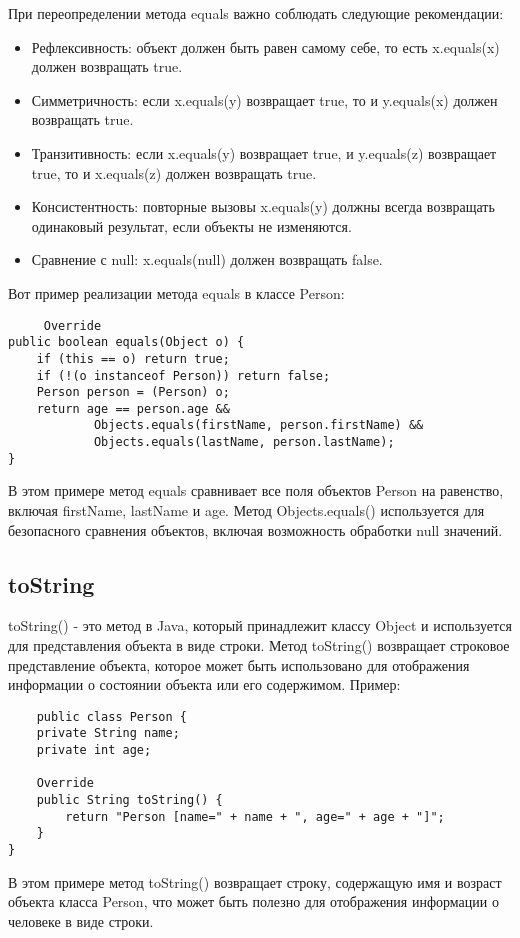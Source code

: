 При переопределении метода equals важно соблюдать следующие рекомендации:
\begin{itemize}
    \item Рефлексивность: объект должен быть равен самому себе, то есть x.equals(x) должен возвращать true.
    \item Симметричность: если x.equals(y) возвращает true, то и y.equals(x) должен возвращать true.
    \item Транзитивность: если x.equals(y) возвращает true, и y.equals(z) возвращает true, то и x.equals(z) должен возвращать true.
    \item Консистентность: повторные вызовы x.equals(y) должны всегда возвращать одинаковый результат, если объекты не изменяются.
    \item Сравнение с null: x.equals(null) должен возвращать false.
\end{itemize}
Вот пример реализации метода equals в классе Person:

\begin{lstlisting}
     Override
public boolean equals(Object o) {
    if (this == o) return true;
    if (!(o instanceof Person)) return false;
    Person person = (Person) o;
    return age == person.age &&
            Objects.equals(firstName, person.firstName) &&
            Objects.equals(lastName, person.lastName);
}
\end{lstlisting}
В этом примере метод equals сравнивает все поля объектов Person на равенство, включая firstName, lastName и age. Метод Objects.equals() используется для безопасного сравнения объектов, включая возможность обработки null значений.
\subsection{toString}
toString() - это метод в Java, который принадлежит классу Object и используется для представления объекта в виде строки. Метод toString() возвращает строковое представление объекта, которое может быть использовано для отображения информации о состоянии объекта или его содержимом.
Пример:
\begin{lstlisting}
    public class Person {
    private String name;
    private int age;
    
    Override
    public String toString() {
        return "Person [name=" + name + ", age=" + age + "]";
    }
}
\end{lstlisting}
В этом примере метод toString() возвращает строку, содержащую имя и возраст объекта класса Person, что может быть полезно для отображения информации о человеке в виде строки.
